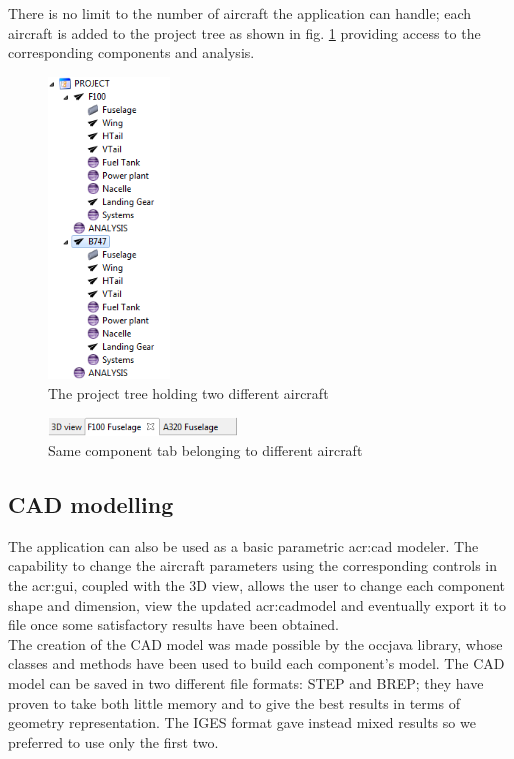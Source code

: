 

There is no limit to the number of aircraft the application can handle; each aircraft is added to the project tree as shown in fig. \ref{fig:projectTreeMulti} providing access to the corresponding components and analysis.

\begin{figure}[H]
	\centering
	\includegraphics[height=8cm]{Immagini/gui/projectTreeMulti.png}
	\caption{The project tree holding two different aircraft}
	\label{fig:projectTreeMulti}
\end{figure}

\begin{figure}[h]
	\centering
	\includegraphics[width=5cm]{Immagini/gui/tabId.png}
	\caption{Same component tab belonging to different aircraft}
	\label{fig:tabId}
\end{figure}



\subsection{CAD modelling}
The application can also be used as a basic parametric \gls{acr:cad} modeler. The capability to change the aircraft parameters using the corresponding controls in the \gls{acr:gui}, coupled with the 3D view, allows the user to change each component shape and dimension, view the updated \gls{acr:cad}model and eventually export it to file once some satisfactory results have been obtained.\\
The creation of the CAD model was made possible by the occjava library, whose classes and methods have been used to build each component’s model. The CAD model can be saved in two different file formats: STEP and BREP; they have proven to take both little memory and to give the best results in terms of geometry representation. The IGES format gave instead mixed results so we preferred to use only the first two.

